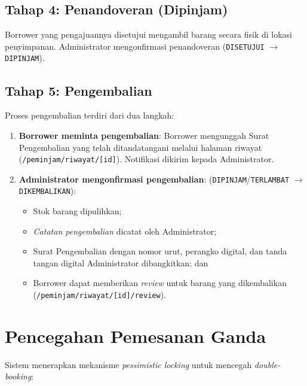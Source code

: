 \documentclass[
  12pt,
  a4paper,
  oneside,
  final
]{report}
\begin{document}
\subsection{Tahap 4: Penandoveran (Dipinjam)}
Borrower yang pengajuannya disetujui mengambil barang secara
fisik di lokasi penyimpanan. Administrator mengonfirmasi
penandoveran (\texttt{DISETUJUI} $\rightarrow$ \texttt{DIPINJAM}).

\subsection{Tahap 5: Pengembalian}

Proses pengembalian terdiri dari dua langkah:

\begin{enumerate}
  \item {\bfseries Borrower meminta pengembalian}: Borrower
        mengunggah Surat Pengembalian yang telah ditandatangani
        melalui halaman riwayat (\texttt{/peminjam/riwayat/[id]}).
        Notifikasi dikirim kepada Administrator.

  \item {\bfseries Administrator mengonfirmasi pengembalian}:
        (\texttt{DIPINJAM}/\texttt{TERLAMBAT} $\rightarrow$
        \texttt{DIKEMBALIKAN}):
        \begin{itemize}
          \item Stok barang dipulihkan;
          \item {\it Catatan pengembalian} dicatat oleh Administrator;
          \item Surat Pengembalian dengan nomor urut, perangko
                digital, dan tanda tangan digital Administrator
                dibangkitkan; dan
          \item Borrower dapat memberikan {\it review} untuk
                barang yang dikembalikan
                (\texttt{/peminjam/riwayat/[id]/review}).
        \end{itemize}
\end{enumerate}

\section{Pencegahan Pemesanan Ganda}

Sistem menerapkan mekanisme {\it pessimistic locking} untuk
mencegah {\it double-booking}:
\end{document}

